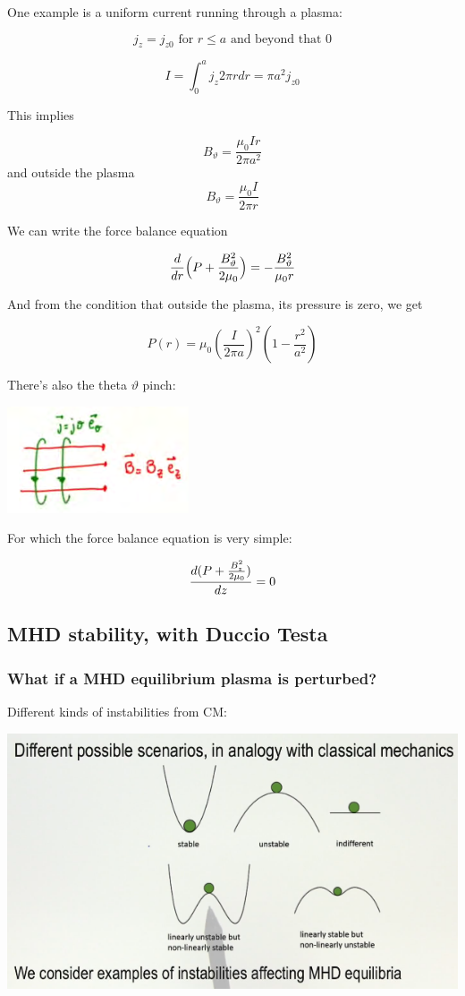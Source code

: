 \documentclass[PlasmaNotes.tex]{subfiles}
\begin{document}
One example is a uniform current running through a plasma:

\[ j_z = j_{z0} \text{ for } r\leq a \text{ and beyond that } 0 \]

\[I = \int_0^a{j_z 2 \pi r dr} = \pi a^2 j_{z0} \]

This implies

\[ B_{\vartheta} = \frac{\mu_0 I r}{2 \pi a^2} \]
and outside the plasma
\[ B_{\vartheta} = \frac{\mu_0 I}{2 \pi r} \]

We can write the force balance equation

\[ \frac{d }{d r} \Big(P + \frac{B_{\vartheta}^2}{2\mu_0} \Big) = - \frac{B_{\vartheta}^2}{\mu_0 r} \]

And from the condition that outside the plasma, its pressure is zero, we get

\[ P(r) = \mu_0 (\frac{I}{2 \pi a})^2 (1-\frac{r^2}{a^2}) \]

There's also the theta $\vartheta$ pinch:

\includegraphics{thetapinch}


For which the force balance equation is very simple:

\[\frac{d (P+\frac{B_z^2}{2\mu_0})}{d z}=0 \]

\subsection{MHD stability, with Duccio Testa}
\subsubsection{What if a MHD equilibrium plasma is perturbed?}
Different kinds of instabilities from CM:

\includegraphics{mhdclassicalmechanicsinstabilities}
\end{document}
